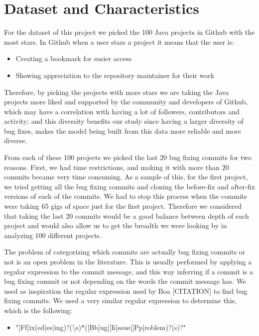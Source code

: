 \documentclass{sig-alternate-05-2015}
\begin{document}
\section{Dataset and Characteristics}
For the dataset of this project we picked the 100 Java projects in Github with the most stars. In Github when a user stars a project it means that the user is:
\begin{itemize}
  \item Creating a bookmark for easier access
  \item Showing appreciation to the repository maintainer for their work
\end{itemize}

Therefore, by picking the projects with more stars we are taking the Java projects more liked and supported by the community and developers of Github, which may have a correlation with having a lot of followers, contributors and activity; and this diversity benefits our study since having a larger diversity of bug fixes, makes the model being built from this data more reliable and more diverse.

From each of these 100 projects we picked the last 20 bug fixing commits for two reasons. First, we had time restrictions, and making it with more than 20 commits became very time consuming. As a sample of this, for the first project, we tried getting all the bug fixing commits and cloning the before-fix and after-fix versions of each of the commits. We had to stop this process when the commits were taking 65 gigs of space just for the first project. Therefore we considered that taking the last 20 commits would be a good balance between depth of each project and would also allow us to get the breadth we were looking by in analyzing 100 different projects. 

The problem of categorizing which commits are actually bug fixing commits or not is an open problem in the literature. This is usually performed by applying a regular expression to the commit message, and this way inferring if a commit is a bug fixing commit or not depending on the words the commit message has. We used as inspiration the regular expression used by Boa [CITATION] to find bug fixing commits. We used a very similar regular expression to determine this, which is the following:
\begin{itemize}
  \item "[Ff]ix(ed|es|ing)?(\textbackslash s)*([Bb]ug|[Ii]ssue|[Pp]roblem)?(s)?"
\end{itemize}
\end{document}
